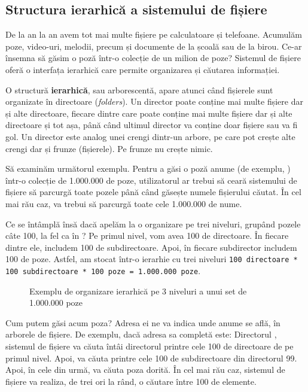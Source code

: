 \subsection{Structura ierarhică a sistemului de fișiere}
\label{sec:fs:filesystem}

De la an la an avem tot mai multe fișiere pe calculatoare și telefoane.
Acumulăm poze, video-uri, melodii, precum și documente de la școală sau de la birou.
Ce-ar însemna să găsim o poză într-o colecție de un milion de poze? Sistemul de fișiere oferă o interfața ierarhică care permite organizarea și căutarea informației.

O structură \textbf{ierarhică}, sau arborescentă, apare atunci când fișierele sunt organizate în directoare (\textit{folders}).
Un director poate conține mai multe fișiere dar și alte directoare, fiecare dintre care poate conține mai multe fișiere dar și alte directoare și tot așa, până când ultimul director va conține doar fișiere sau va fi gol.
Un director este analog unei crengi dintr-un arbore, pe care pot crește alte crengi dar și frunze (fișierele).
Pe frunze nu crește nimic.

Să examinăm următorul exemplu.
Pentru a găsi o poză anume (de exemplu, ) într-o colecție de 1.000.000 de poze, utilizatorul ar trebui să ceară sistemului de fișiere să parcurgă toate pozele până când găsește numele fișierului căutat.
În cel mai rău caz, va trebui să parcurgă toate cele 1.000.000 de nume.

Ce se întâmplă însă dacă apelăm la o organizare pe trei niveluri, grupând pozele câte 100, la fel ca în ? Pe primul nivel, vom avea 100 de directoare.
În fiecare dintre ele, includem 100 de subdirectoare.
Apoi, în fiecare subdirector includem 100 de poze.
Astfel, am stocat într-o ierarhie cu trei niveluri \texttt{100 directoare * 100 subdirectoare * 100 poze = 1.000.000 poze}.

\begin{figure}[htbp]
  \centering
  \def\svgwidth{\columnwidth}
  
  \caption{Exemplu de organizare ierarhică pe 3 niveluri a unui set de 1.000.000 poze}
  \label{fig:fs:ex-3-lvl}
\end{figure}

Cum putem găsi acum poza? Adresa ei ne va indica unde anume se află, în arborele de fișiere.
De exemplu, dacă adresa sa completă este: Directorul , sistemul de fișiere va căuta întâi directorul  printre cele 100 de directoare de pe primul nivel.
Apoi, va căuta  printre cele 100 de subdirectoare din directorul 99.
 Apoi, în cele din urmă, va căuta poza dorită.
În cel mai rău caz, sistemul de fișiere va realiza, de trei ori la rând, o căutare între 100 de elemente.

